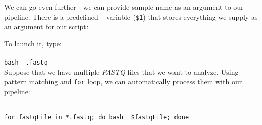 \begin{samepage}

\end{samepage}
%

We can go even further - we can provide sample name as an argument
to our pipeline. There is a predefined \bash~ variable (\texttt{\$1})
that stores everything we supply as an argument for our script:

\begin{samepage}

\end{samepage}

To launch it, type:\\~\\
\texttt{bash \pipename~\mapReads.fastq}\\

Suppose that we have multiple \textit{FASTQ} files that we want to analyze.
Using pattern matching and \texttt{for} loop, we can automatically process them with our pipeline:\\~\\
\begin{samepage}
\texttt{for~fastqFile~in~*.fastq;~do~bash~\pipename~\$fastqFile;~done}
\end{samepage}
